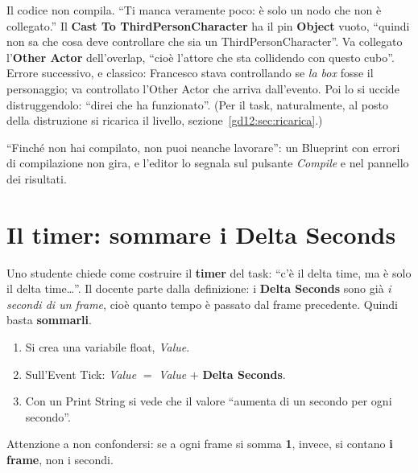 Il codice non compila. ``Ti manca veramente poco: è solo un nodo che non è
collegato.'' Il \textbf{Cast To ThirdPersonCharacter} ha il pin
\textbf{Object} vuoto, ``quindi non sa che cosa deve controllare che sia un
ThirdPersonCharacter''. Va collegato l'\textbf{Other Actor} dell'overlap,
``cioè l'attore che sta collidendo con questo cubo''. Errore successivo, e
classico: Francesco stava controllando se \emph{la box} fosse il personaggio;
va controllato l'Other Actor che arriva dall'evento. Poi lo si uccide
distruggendolo: ``direi che ha funzionato''. (Per il task, naturalmente, al posto
della distruzione si ricarica il livello, sezione~\ref{gd12:sec:ricarica}.)

``Finché non hai compilato, non puoi neanche lavorare'': un Blueprint con errori
di compilazione non gira, e l'editor lo segnala sul pulsante \emph{Compile} e
nel pannello dei risultati.

\section{Il timer: sommare i Delta Seconds}
\label{gd12:sec:timer}

Uno studente chiede come costruire il \textbf{timer} del task: ``c'è il delta
time, ma è solo il delta time\dots{}''. Il docente parte dalla definizione:
i \textbf{Delta Seconds} sono già \emph{i secondi di un frame}, cioè quanto tempo
è passato dal frame precedente. Quindi basta \textbf{sommarli}.
\begin{enumerate}
  \item Si crea una variabile float, \emph{Value}.
  \item Sull'Event Tick: \emph{Value} $=$ \emph{Value} $+$ \textbf{Delta
        Seconds}.
  \item Con un Print String si vede che il valore ``aumenta di un secondo per
        ogni secondo''.
\end{enumerate}
Attenzione a non confondersi: se a ogni frame si somma \textbf{1}, invece, si
contano \textbf{i frame}, non i secondi.

